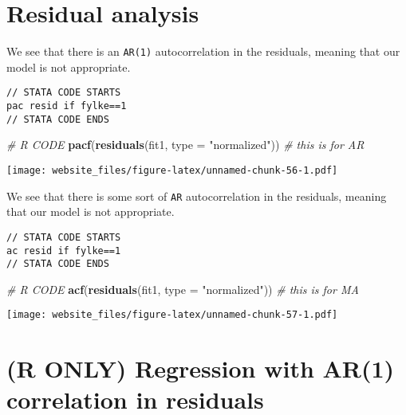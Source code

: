 \documentclass[]{book}
\newenvironment{Shaded}{\begin{snugshade}}{\end{snugshade}}
\newcommand{\KeywordTok}[1]{\textcolor[rgb]{0.13,0.29,0.53}{\textbf{#1}}}
\newcommand{\DataTypeTok}[1]{\textcolor[rgb]{0.13,0.29,0.53}{#1}}
\newcommand{\StringTok}[1]{\textcolor[rgb]{0.31,0.60,0.02}{#1}}
\newcommand{\CommentTok}[1]{\textcolor[rgb]{0.56,0.35,0.01}{\textit{#1}}}
\newcommand{\NormalTok}[1]{#1}
\begin{document}
\newpage

\section{Residual analysis}\label{residual-analysis-2}

We see that there is an \texttt{AR(1)} autocorrelation in the residuals,
meaning that our model is not appropriate.

\begin{verbatim}
// STATA CODE STARTS
pac resid if fylke==1
// STATA CODE ENDS
\end{verbatim}

\begin{Shaded}
\begin{Highlighting}[]
\CommentTok{# R CODE}
\KeywordTok{pacf}\NormalTok{(}\KeywordTok{residuals}\NormalTok{(fit1, }\DataTypeTok{type =} \StringTok{"normalized"}\NormalTok{)) }\CommentTok{# this is for AR}
\end{Highlighting}
\end{Shaded}

\texttt{[image: website\_files/figure-latex/unnamed-chunk-56-1.pdf]}

\newpage

We see that there is some sort of \texttt{AR} autocorrelation in the
residuals, meaning that our model is not appropriate.

\begin{verbatim}
// STATA CODE STARTS
ac resid if fylke==1
// STATA CODE ENDS
\end{verbatim}

\begin{Shaded}
\begin{Highlighting}[]
\CommentTok{# R CODE}
\KeywordTok{acf}\NormalTok{(}\KeywordTok{residuals}\NormalTok{(fit1, }\DataTypeTok{type =} \StringTok{"normalized"}\NormalTok{)) }\CommentTok{# this is for MA}
\end{Highlighting}
\end{Shaded}

\texttt{[image: website\_files/figure-latex/unnamed-chunk-57-1.pdf]}

\newpage

\section{(R ONLY) Regression with AR(1) correlation in
residuals}\label{r-only-regression-with-ar1-correlation-in-residuals-1}
\end{document}
